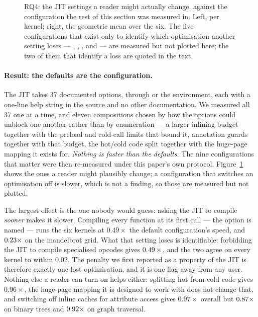 \begin{figure}[t]
  \centering
  \caption{RQ4: the JIT settings a reader might actually change, against the configuration the
    rest of this section was measured in. Left, per kernel; right, the geometric mean over the
    six. The five configurations that exist only to identify which optimisation another setting
    loses --- , , ,
     and  --- are measured but not plotted here; the
    two of them that identify a loss are quoted in the text.}
  \label{fig:jitopts}
\end{figure}

\paragraph{Result: the defaults are the configuration.} The JIT takes 37 documented options,
through  or the environment, each with a one-line help string in the
source and no other documentation. We measured all 37 one at a time, and eleven compositions
chosen by how the options could unblock one another rather than by enumeration --- a larger
inlining budget together with the preload and cold-call limits that bound it, annotation guards
together with that budget, the hot/cold code split together with the huge-page mapping it exists
for. \emph{Nothing is faster than the defaults.} The nine configurations that matter were then
re-measured under this paper's own protocol. Figure~\ref{fig:jitopts} shows the ones a reader
might plausibly change; a configuration that switches an optimisation off is slower, which is
not a finding, so those are measured but not plotted.

The largest effect is the one nobody would guess: asking the JIT to compile \emph{sooner} makes
it slower. Compiling every function at its first call --- the option is named  ---
runs the six kernels at $0.49\times$ the default configuration's speed, and $\meas{ratio:b6_cinderx-jitopt_default:mandelbrot/jitopt_default|b6_cinderx-jitopt_compile_at_first_call:mandelbrot/jitopt_compile_at_first_call}{0.23}\times$ on the
mandelbrot grid. What that setting loses is identifiable: forbidding the JIT to compile
specialised opcodes gives $0.49\times$, and the two agree on every kernel to within $0.02$. The
penalty we first reported as a property of the JIT is therefore exactly one lost optimisation,
and it is one  flag away from any user. Nothing else a reader can turn on helps
either: splitting hot from cold code gives $0.96\times$, the huge-page mapping it is designed to
work with does not change that, and switching off inline caches for attribute access gives
$0.97\times$ overall but $\meas{ratio:b6_cinderx-jitopt_default:binarytrees/jitopt_default|b6_cinderx-jitopt_no_attr_caches:binarytrees/jitopt_no_attr_caches}{0.87}\times$ on binary trees and $\meas{ratio:b6_cinderx-jitopt_default:bfs/jitopt_default|b6_cinderx-jitopt_no_attr_caches:bfs/jitopt_no_attr_caches}{0.92}\times$ on graph traversal.


